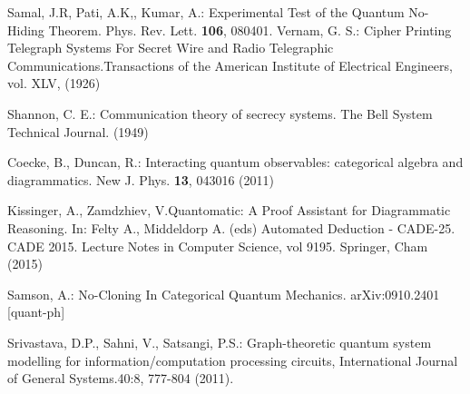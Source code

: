 \begin{thebibliography}{66}
 Samal, J.R, Pati, A.K,, Kumar, A.: Experimental Test of the Quantum No-Hiding Theorem. Phys. Rev. Lett. \textbf{106}, 080401.
 Vernam, G. S.: Cipher Printing Telegraph Systems For Secret Wire and Radio Telegraphic Communications.Transactions of the American Institute of Electrical Engineers, vol. XLV, (1926)

 Shannon, C. E.: Communication theory of secrecy systems.
The Bell System Technical Journal. (1949)

 Coecke, B., Duncan, R.: Interacting quantum observables: categorical algebra and diagrammatics. New J. Phys. \textbf{13}, 043016 (2011)

 Kissinger, A., Zamdzhiev, V.Quantomatic: A Proof Assistant for Diagrammatic Reasoning. In: Felty A., Middeldorp A. (eds) Automated Deduction - CADE-25. CADE 2015. Lecture Notes in Computer Science, vol 9195. Springer, Cham (2015)

 Samson, A.: No-Cloning In Categorical Quantum Mechanics. arXiv:0910.2401 [quant-ph]

Srivastava, D.P., Sahni, V., Satsangi, P.S.: Graph-theoretic quantum system modelling for information/computation processing circuits, International Journal of General Systems.40:8, 777-804 (2011).

\end{thebibliography}



